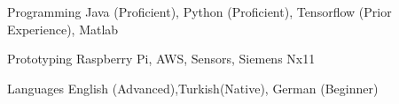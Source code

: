 

\begin{cvskills}

  \cvskill
    {Programming} %
    {Java (Proficient), Python (Proficient), Tensorflow (Prior Experience), Matlab} %

  \cvskill
    {Prototyping} %
    {Raspberry Pi, AWS, Sensors, Siemens Nx11} %

  \cvskill
    {Languages} %
    {English (Advanced),Turkish(Native), German (Beginner)} %

\end{cvskills}
